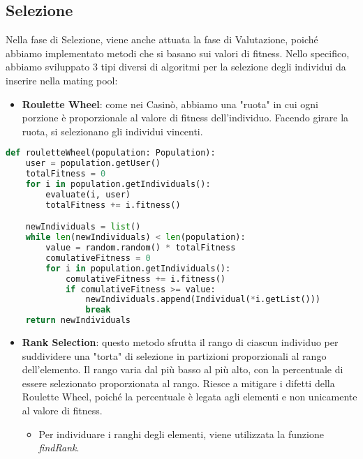 \documentclass{article}
\begin{document}
\pagebreak

\subsection{Selezione}

Nella fase di Selezione, viene anche attuata la fase di Valutazione, poiché abbiamo implementato metodi che si basano sui valori di fitness. Nello specifico, abbiamo sviluppato 3 tipi diversi di algoritmi per la selezione degli individui da inserire nella mating pool:

\begin{itemize}
\item\textbf{Roulette Wheel}: come nei Casinò, abbiamo una "ruota" in cui ogni porzione è proporzionale al valore di fitness dell'individuo. Facendo girare la ruota, si selezionano gli individui vincenti.
\end{itemize}

\begin{lstlisting}[language=Python]
def rouletteWheel(population: Population):
    user = population.getUser()
    totalFitness = 0
    for i in population.getIndividuals():
        evaluate(i, user)
        totalFitness += i.fitness()

    newIndividuals = list()
    while len(newIndividuals) < len(population):
        value = random.random() * totalFitness
        comulativeFitness = 0
        for i in population.getIndividuals():
            comulativeFitness += i.fitness()
            if comulativeFitness >= value:
                newIndividuals.append(Individual(*i.getList()))
                break
    return newIndividuals
\end{lstlisting}

\begin{itemize}
\item\textbf{Rank Selection}: questo metodo sfrutta il rango di ciascun individuo per suddividere una "torta" di selezione in partizioni proporzionali al rango dell'elemento. Il rango varia dal più basso al più alto, con la percentuale di essere selezionato proporzionata al rango. Riesce a mitigare i difetti della Roulette Wheel, poiché la percentuale è legata agli elementi e non unicamente al valore di fitness. 
\begin{itemize}
    \item Per individuare i ranghi degli elementi, viene utilizzata la funzione \textit{findRank}.
\end{itemize}

\end{itemize}
\end{document}
